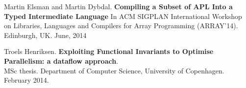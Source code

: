 \documentclass[11pt]{article}
\begin{document}
\begin{thebibliography}{widest entry}

   Martin Elsman and Martin Dybdal. \textbf{Compiling a Subset of APL Into a Typed Intermediate Language} In ACM SIGPLAN International Workshop on Libraries, Languages and Compilers for Array Programming (ARRAY’14). Edinburgh, UK. June, 2014

   Troels Henriksen. \textbf{Exploiting Functional Invariants to Optimise Parallelism: a dataflow approach}.\\   MSc thesis. Department of Computer Science, University of Copenhagen. February 2014.
  

\end{thebibliography}
\end{document}
